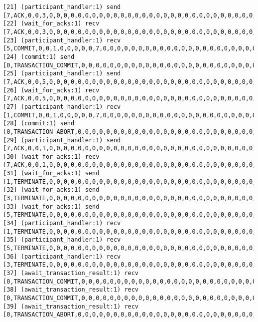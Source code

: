 \begin{lstlisting}[xleftmargin=.01\linewidth, xrightmargin=0.01\linewidth, caption={Message passing caused by the proposer's protocol bug.}, label={lst:paxos_bug}]
[21] (participant_handler:1) send [7,ACK,0,0,3,0,0,0,0,0,0,0,0,0,0,0,0,0,0,0,0,0,0,0,0,0,0,0,0,0,0,0,0,0,0,0,0,0]
[22] (wait_for_acks:1) recv [7,ACK,0,0,3,0,0,0,0,0,0,0,0,0,0,0,0,0,0,0,0,0,0,0,0,0,0,0,0,0,0,0,0,0,0,0,0,0]
[23] (participant_handler:1) recv [5,COMMIT,0,0,1,0,0,0,0,0,7,0,0,0,0,0,0,0,0,0,0,0,0,0,0,0,0,0,0,0,0,0,0,0,0,0,0,0]
[24] (commit:1) send [0,TRANSACTION_COMMIT,0,0,0,0,0,0,0,0,0,0,0,0,0,0,0,0,0,0,0,0,0,0,0,0,0,0,0,0,0,0,0,0,0,0,0,0]
[25] (participant_handler:1) send [7,ACK,0,0,5,0,0,0,0,0,0,0,0,0,0,0,0,0,0,0,0,0,0,0,0,0,0,0,0,0,0,0,0,0,0,0,0,0]
[26] (wait_for_acks:1) recv [7,ACK,0,0,5,0,0,0,0,0,0,0,0,0,0,0,0,0,0,0,0,0,0,0,0,0,0,0,0,0,0,0,0,0,0,0,0,0]
[27] (participant_handler:1) recv [1,COMMIT,0,0,1,0,0,0,0,0,7,0,0,0,0,0,0,0,0,0,0,0,0,0,0,0,0,0,0,0,0,0,0,0,0,0,0,0]
[28] (commit:1) send [0,TRANSACTION_ABORT,0,0,0,0,0,0,0,0,0,0,0,0,0,0,0,0,0,0,0,0,0,0,0,0,0,0,0,0,0,0,0,0,0,0,0,0]
[29] (participant_handler:1) send [7,ACK,0,0,1,0,0,0,0,0,0,0,0,0,0,0,0,0,0,0,0,0,0,0,0,0,0,0,0,0,0,0,0,0,0,0,0,0]
[30] (wait_for_acks:1) recv [7,ACK,0,0,1,0,0,0,0,0,0,0,0,0,0,0,0,0,0,0,0,0,0,0,0,0,0,0,0,0,0,0,0,0,0,0,0,0]
[31] (wait_for_acks:1) send [1,TERMINATE,0,0,0,0,0,0,0,0,0,0,0,0,0,0,0,0,0,0,0,0,0,0,0,0,0,0,0,0,0,0,0,0,0,0,0,0]
[32] (wait_for_acks:1) send [3,TERMINATE,0,0,0,0,0,0,0,0,0,0,0,0,0,0,0,0,0,0,0,0,0,0,0,0,0,0,0,0,0,0,0,0,0,0,0,0]
[33] (wait_for_acks:1) send [5,TERMINATE,0,0,0,0,0,0,0,0,0,0,0,0,0,0,0,0,0,0,0,0,0,0,0,0,0,0,0,0,0,0,0,0,0,0,0,0]
[34] (participant_handler:1) recv [1,TERMINATE,0,0,0,0,0,0,0,0,0,0,0,0,0,0,0,0,0,0,0,0,0,0,0,0,0,0,0,0,0,0,0,0,0,0,0,0]
[35] (participant_handler:1) recv [5,TERMINATE,0,0,0,0,0,0,0,0,0,0,0,0,0,0,0,0,0,0,0,0,0,0,0,0,0,0,0,0,0,0,0,0,0,0,0,0]
[36] (participant_handler:1) recv [3,TERMINATE,0,0,0,0,0,0,0,0,0,0,0,0,0,0,0,0,0,0,0,0,0,0,0,0,0,0,0,0,0,0,0,0,0,0,0,0]
[37] (await_transaction_result:1) recv [0,TRANSACTION_COMMIT,0,0,0,0,0,0,0,0,0,0,0,0,0,0,0,0,0,0,0,0,0,0,0,0,0,0,0,0,0,0,0,0,0,0,0,0]
[38] (await_transaction_result:1) recv [0,TRANSACTION_COMMIT,0,0,0,0,0,0,0,0,0,0,0,0,0,0,0,0,0,0,0,0,0,0,0,0,0,0,0,0,0,0,0,0,0,0,0,0]
[39] (await_transaction_result:1) recv [0,TRANSACTION_ABORT,0,0,0,0,0,0,0,0,0,0,0,0,0,0,0,0,0,0,0,0,0,0,0,0,0,0,0,0,0,0,0,0,0,0,0,0]
\end{lstlisting}

